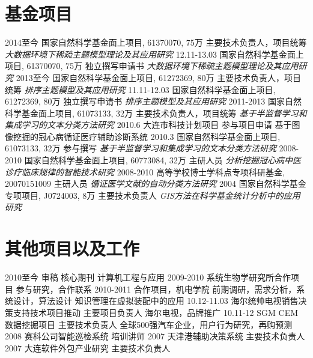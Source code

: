 \documentclass[]{friggeri-cv}
\begin{document}
\section{基金项目}

\begin{entrylist}
  \entry
    {2014至今}
    {国家自然科学基金面上项目, 61370070, 75万}
    {主要技术负责人，项目统筹}
    {\emph{大数据环境下稀疏主题模型理论及其应用研究}}
  \entry
    {12.11-13.03}
    {国家自然科学基金面上项目, 61370070, 75万}
    {独立撰写申请书}
    {\emph{大数据环境下稀疏主题模型理论及其应用研究}}
  \entry
    {2013至今}
    {国家自然科学基金面上项目, 61272369, 80万}
    {主要技术负责人，项目统筹}
    {\emph{排序主题模型及其应用研究}}
  \entry
    {11.11-12.03}
    {国家自然科学基金面上项目, 61272369, 80万}
    {独立撰写申请书}
    {\emph{排序主题模型及其应用研究}}
  \entry
    {2011-2013}
    {国家自然科学基金面上项目, 61073133, 32万}
    {主要技术负责人，项目统筹}
    {\emph{基于半监督学习和集成学习的文本分类方法研究}}
  \entry
    {2010.6}
    {大连市科技计划项目}
    {参与项目申请}
    {基于图像挖掘的冠心病循证医疗辅助诊断系统}
  \entry
    {2010.3}
    {国家自然科学基金面上项目, 61073133, 32万}
    {参与撰写}
    {\emph{基于半监督学习和集成学习的文本分类方法研究}}
  \entry
    {2008-2010}
    {国家自然科学基金面上项目, 60773084, 32万}
    {主研人员}
    {\emph{分析挖掘冠心病中医诊疗临床规律的智能技术研究}}
  \entry
    {2008-2010}
    {高等学校博士学科点专项科研基金, 20070151009}
    {主研人员}
    {\emph{循证医学文献的自动分类方法研究}}
  \entry
    {2004}
    {国家自然科学基金专项项目, J0724003, 8万}
    {主要技术负责人}
    {\emph{GIS方法在科学基金统计分析中的应用研究}}
\end{entrylist}

\section{其他项目以及工作}
\begin{entrylist}
  \entry
    {2010至今}
    {审稿}
    {核心期刊}
    {计算机工程与应用}
  \entry
    {2009-2010}
    {系统生物学研究所合作项目}
    {参与研究，合作联系}
    {}
  \entry
    {2010-2011}
    {合作项目，机电学院}
    {前期调研，需求分析，系统设计，算法设计}
    {知识管理在虚拟装配中的应用}
  \entry
    {10.12-11.03}
    {海尔统帅电视销售决策支持技术项目推动}
    {主要项目负责人}
    {海尔电视，品牌推广}
  \entry
    {10.11-12}
    {SGM CEM 数据挖掘项目}
    {主要技术负责人}
    {全球500强汽车企业，用户行为研究，再购预测}
  \entry
    {2008}
    {赛科公司智能巡检系统}
    {培训讲师}
    {}
  \entry
    {2007}
    {天津港辅助决策系统}
    {主要技术负责人}
    {}
  \entry
    {2007}
    {大连软件外包产业研究}
    {主要技术负责人}
    {}
\end{entrylist}
\end{document}
